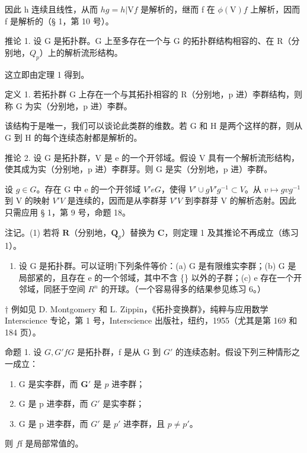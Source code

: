 因此 h 连续且线性，从而 \(h\)\(g = h|\mathrm{V}\)\(f\) 是解析的，继而 f 在 \(\phi(\mathrm{V})\)\(f\) 上解析，因而 f 是解析的（§ 1，第 10 号）。

推论 1. 设 G 是拓扑群。G 上至多存在一个与 G 的拓扑群结构相容的、在 R（分别地，\(Q_{p}\)）上的解析流形结构。

这立即由定理 1 得到。

定义 1. 若拓扑群 G 上存在一个与其拓扑相容的 R（分别地，p 进）李群结构，则称 G 为实（分别地，p 进）李群。

该结构于是唯一，我们可以谈论此类群的维数。若 G 和 H 是两个这样的群，则从 G 到 H 的每个连续态射都是解析的。

推论 2. 设 G 是拓扑群，V 是 e 的一个开邻域。假设 V 具有一个解析流形结构，使其成为实（分别地，p 进）李群芽。则 G 是实（分别地，p 进）李群。

设 \(g \in G\)。存在 G 中 e 的一个开邻域 \(V'\)\(e\)\(G\)，使得 \(V' \cup gV'g^{-1} \subset V\)。从 \(v \mapsto gvg^{-1}\) 到 V 的映射 \(V'\)\(V\) 是连续的，因而是从李群芽 \(V'\)\(V\) 到李群芽 V 的解析态射。因此只需应用 § 1，第 9 号，命题 18。

注记。(1) 若将 \(\mathbf{R}\)（分别地，\(\mathbf{Q}_p\)）替换为 \(\mathbf{C}\)，则定理 1 及其推论不再成立（练习 1）。

\begin{enumerate}
\def\labelenumi{(\arabic{enumi})}
\setcounter{enumi}{1}
\tightlist
\item
设 G 是拓扑群。可以证明†下列条件等价：(a) G 是有限维实李群；(b) G 是局部紧的，且存在 e 的一个邻域，其中不含 \{\} 以外的子群；(c) e 存在一个开邻域，同胚于空间 \(R^{n}\) 的开球。（一个容易得多的结果参见练习 6。）
\end{enumerate}
† 例如见 D. Montgomery 和 L. Zippin，《拓扑变换群》，纯粹与应用数学 Interscience 专论，第 1 号，Interscience 出版社，纽约，1955（尤其是第 169 和 184 页）。

命题 1. 设 \(G, G'\)\(f\)\(G\) 是拓扑群，f 是从 G 到 \(G'\) 的连续态射。假设下列三种情形之一成立：

\begin{enumerate}
\def\labelenumi{(\alph{enumi})}
\item
  G 是实李群，而 \(\mathbf{G}'\) 是 \(p\) 进李群；
\item
  G 是 p 进李群，而 \(G'\) 是实李群；
\item
  G 是 p 进李群，而 \(G'\) 是 \(p'\) 进李群，且 \(p \neq p'\)。
\end{enumerate}

则 \(f\)f 是局部常值的。


